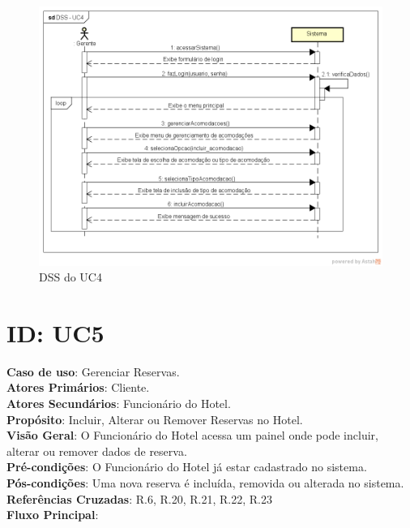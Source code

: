 \documentclass[notitlepage]{article}
\begin{document}
\begin{figure}[!htbp]
	\centering
  \includegraphics[scale=0.65]{UC4.png}
  \caption{DSS do UC4}
  \label{fig:UC4}
\end{figure}


\clearpage

\section{ID: UC5}
\noindent\textbf{Caso de uso}: Gerenciar Reservas.\\
\textbf{Atores Primários}: Cliente. \\
\textbf{Atores Secundários}: Funcionário do Hotel.\\
\textbf{Propósito}: Incluir, Alterar ou Remover Reservas no Hotel.\\
\textbf{Visão Geral}: O Funcionário do Hotel acessa um painel onde pode incluir, alterar ou remover dados de reserva.\\
\textbf{Pré-condições}: O Funcionário do Hotel já estar cadastrado no sistema.\\
\textbf{Pós-condições}: Uma nova reserva é incluída, removida ou alterada no sistema.\\
\textbf{Referências Cruzadas}: R.6, R.20, R.21, R.22, R.23\\
\newline
\textbf{Fluxo Principal}:\\
\end{document}
